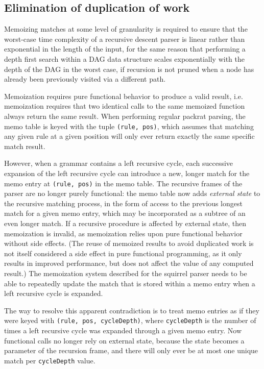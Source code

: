\documentclass[manuscript]{acmart}
\begin{document}
\subsection{\label{sec:DupdWork}Elimination of duplication of work}

Memoizing matches at some level of granularity is required to ensure that the worst-case time complexity of a recursive descent parser is linear rather than exponential in the length of the input, %
for the same reason that performing a depth first search within a DAG data structure scales exponentially with the depth of the DAG in the worst case, if recursion is not pruned when a node has already been previously visited via a different path.

Memoization requires pure functional behavior to produce a valid result, i.e. memoization requires that two identical calls to the same memoized function always return the same result. When performing regular packrat parsing, the memo table is keyed with the tuple \texttt{(rule, pos)}, which assumes that matching any given rule at a given position will only ever return exactly the same specific match result.

However, when a grammar contains a left recursive cycle, each successive expansion of the left recursive cycle can introduce a new, longer match for the memo entry at \texttt{(rule, pos)} in the memo table. The recursive frames of the parser are no longer purely functional: the memo table now adds \emph{external state} to the recursive matching process, in the form of access to the previous longest match for a given memo entry, which may be incorporated as a subtree of an even longer match. If a recursive procedure is affected by external state, then memoization is invalid, as memoization relies upon pure functional behavior without side effects. (The reuse of memoized results to avoid duplicated work is not itself considered a side effect in pure functional programming, as it only results in improved performance, but does not affect the value of any computed result.) The memoization system described for the squirrel parser needs to be able to repeatedly update the match that is stored within a memo entry when a left recursive cycle is expanded.

The way to resolve this apparent contradiction is to treat memo entries as if they were keyed with \texttt{(rule, pos, cycleDepth)}, where \texttt{cycleDepth} is the number of times a left recursive cycle was expanded through a given memo entry. Now functional calls no longer rely on external state, because the state becomes a parameter of the recursion frame, and there will only ever be at most one unique match per \texttt{cycleDepth} value.
\end{document}
